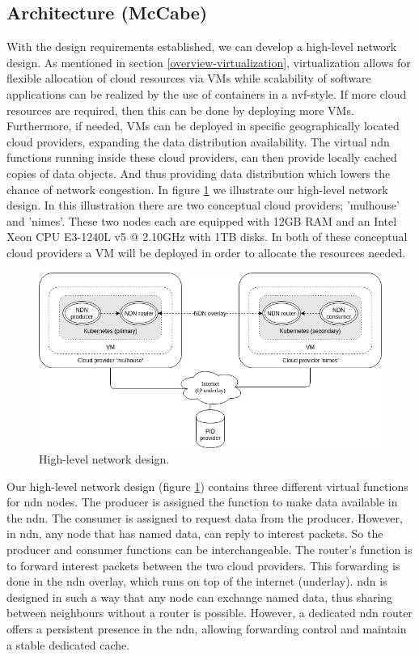 \subsection{Architecture (McCabe)}
\label{planning-architecture}
With the design requirements established, we can develop a high-level network design. As mentioned in section \ref{overview-virtualization}, virtualization allows for flexible allocation of cloud resources via VMs while scalability of software applications can be realized by the use of containers in a \gls{nvf}-style. If more cloud resources are required, then this can be done by deploying more VMs. Furthermore, if needed, VMs can be deployed in specific geographically located cloud providers, expanding the data distribution availability. The virtual \gls{ndn} functions running inside these cloud providers, can then provide locally cached copies of data objects. And thus providing data distribution which lowers the chance of network congestion. In figure \ref{fig:high-level-network-design} we illustrate our high-level network design. In this illustration there are two conceptual cloud providers; 'mulhouse' and 'nimes'. These two nodes each are equipped with 12GB RAM and an Intel Xeon CPU E3-1240L v5 @ 2.10GHz with 1TB disks. In both of these conceptual cloud providers a VM will be deployed in order to allocate the resources needed.

\begin{figure}[H]
\centering
\includegraphics[width=\columnwidth]{Images/high-level-network-design.png}
\caption{High-level network design.}
\label{fig:high-level-network-design}
\end{figure}

Our high-level network design (figure \ref{fig:high-level-network-design}) contains three different virtual functions for \gls{ndn} nodes. The producer is assigned the function to make data available in the \gls{ndn}. The consumer is assigned to request data from the producer. However, in \gls{ndn}, any node that has named data, can reply to interest packets. So the producer and consumer functions can be interchangeable. The router's function is to forward interest packets between the two cloud providers. This forwarding is done in the \gls{ndn} overlay, which runs on top of the internet (underlay). \gls{ndn} is designed in such a way that any node can exchange named data, thus sharing between neighbours without a router is possible. However, a dedicated \gls{ndn} router offers a persistent presence in the \gls{ndn}, allowing forwarding control and maintain a stable dedicated cache.

